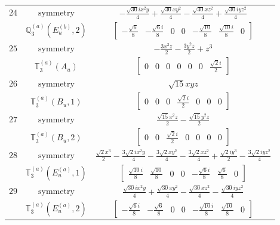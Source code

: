 \documentclass[fleqn,8pt,landscape]{jsarticle}
\begin{document}
\begin{longtable}{ccc}
$ 24 $ & $ \text{symmetry} $ & $ - \frac{\sqrt{30} i x^{2} y}{4} + \frac{\sqrt{30} x y^{2}}{4} - \frac{\sqrt{30} x z^{2}}{4} + \frac{\sqrt{30} i y z^{2}}{4} $ \\
$  $ & $ \mathbb{Q}_{3}^{(a)}(E_{u}^{(b)},2) $ & $ \begin{bmatrix} - \frac{\sqrt{6}}{8} & - \frac{\sqrt{6} i}{8} & 0 & 0 & - \frac{\sqrt{10}}{8} & \frac{\sqrt{10} i}{8} & 0 \end{bmatrix} $ \\ \hline
$ 25 $ & $ \text{symmetry} $ & $ - \frac{3 x^{2} z}{2} - \frac{3 y^{2} z}{2} + z^{3} $ \\
$  $ & $ \mathbb{T}_{3}^{(a)}(A_{u}) $ & $ \begin{bmatrix} 0 & 0 & 0 & 0 & 0 & 0 & \frac{\sqrt{2} i}{2} \end{bmatrix} $ \\ \hline
$ 26 $ & $ \text{symmetry} $ & $ \sqrt{15} x y z $ \\
$  $ & $ \mathbb{T}_{3}^{(a)}(B_{u},1) $ & $ \begin{bmatrix} 0 & 0 & 0 & \frac{\sqrt{2} i}{2} & 0 & 0 & 0 \end{bmatrix} $ \\ \hline
$ 27 $ & $ \text{symmetry} $ & $ \frac{\sqrt{15} x^{2} z}{2} - \frac{\sqrt{15} y^{2} z}{2} $ \\
$  $ & $ \mathbb{T}_{3}^{(a)}(B_{u},2) $ & $ \begin{bmatrix} 0 & 0 & \frac{\sqrt{2} i}{2} & 0 & 0 & 0 & 0 \end{bmatrix} $ \\ \hline
$ 28 $ & $ \text{symmetry} $ & $ \frac{\sqrt{2} x^{3}}{2} - \frac{3 \sqrt{2} i x^{2} y}{4} - \frac{3 \sqrt{2} x y^{2}}{4} - \frac{3 \sqrt{2} x z^{2}}{4} + \frac{\sqrt{2} i y^{3}}{2} - \frac{3 \sqrt{2} i y z^{2}}{4} $ \\
$  $ & $ \mathbb{T}_{3}^{(a)}(E_{u}^{(a)},1) $ & $ \begin{bmatrix} \frac{\sqrt{10} i}{8} & \frac{\sqrt{10}}{8} & 0 & 0 & - \frac{\sqrt{6} i}{8} & \frac{\sqrt{6}}{8} & 0 \end{bmatrix} $ \\ \hline
$ 29 $ & $ \text{symmetry} $ & $ \frac{\sqrt{30} i x^{2} y}{4} + \frac{\sqrt{30} x y^{2}}{4} - \frac{\sqrt{30} x z^{2}}{4} - \frac{\sqrt{30} i y z^{2}}{4} $ \\
$  $ & $ \mathbb{T}_{3}^{(a)}(E_{u}^{(a)},2) $ & $ \begin{bmatrix} - \frac{\sqrt{6} i}{8} & - \frac{\sqrt{6}}{8} & 0 & 0 & - \frac{\sqrt{10} i}{8} & \frac{\sqrt{10}}{8} & 0 \end{bmatrix} $ \\ \hline

\end{longtable}
\end{document}
